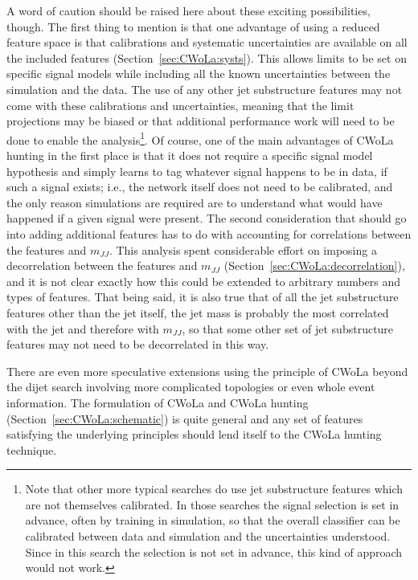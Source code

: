 A word of caution should be raised here about these exciting possibilities, though.
The first thing to mention is that one advantage of using a reduced feature space is that calibrations and systematic uncertainties are available on all the included features (Section~\ref{sec:CWoLa:systs}).
This allows limits to be set on specific signal models while including all the known uncertainties between the simulation and the data.
The use of any other jet substructure features may not come with these calibrations and uncertainties, meaning that the limit projections may be biased or that additional performance work will need to be done to enable the analysis\footnote{Note that other more typical searches do use jet substructure features which are not themselves calibrated. In those searches the signal selection is set in advance, often by training in simulation, so that the overall classifier can be calibrated between data and simulation and the uncertainties understood. Since in this search the selection is not set in advance, this kind of approach would not work.}.
Of course, one of the main advantages of CWoLa hunting in the first place is that it does not require a specific signal model hypothesis and simply learns to tag whatever signal happens to be in data, if such a signal exists; i.e., the network itself does not need to be calibrated, and the only reason simulations are required are to understand what would have happened if a given signal were present.
The second consideration that should go into adding additional features has to do with accounting for correlations between the features and $m_{JJ}$.
This analysis spent considerable effort on imposing a decorrelation between the features and $m_{JJ}$ (Section~\ref{sec:CWoLa:decorrelation}), and it is not clear exactly how this could be extended to arbitrary numbers and types of features.
That being said, it is also true that of all the jet substructure features other than the jet \pt{} itself, the jet mass is probably the most correlated with the jet \pt{} and therefore with $m_{JJ}$, so that some other set of jet substructure features may not need to be decorrelated in this way.

There are even more speculative extensions using the principle of CWoLa beyond the dijet search involving more complicated topologies or even whole event information.
The formulation of CWoLa and CWoLa hunting (Section~\ref{sec:CWoLa:schematic}) is quite general and any set of features satisfying the underlying principles should lend itself to the CWoLa hunting technique.

